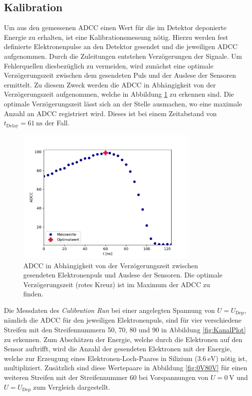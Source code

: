\subsection{Kalibration}
\label{kap:Kalibration}
Um aus den gemessenen ADCC einen Wert für die im Detektor deponierte Energie zu erhalten, ist eine Kalibrationsmessung nötig. Hierzu werden fest definierte Elektronenpulse an den Detektor gesendet und die jeweiligen ADCC aufgenommen.
Durch die Zuleitungen entstehen Verzögerungen der Signale. Um Fehlerquellen diesbezüglich zu vermeiden, wird zunächst eine optimale Verzögerungszeit zwischen dem gesendeten Puls und der Auslese der Sensoren ermittelt. Zu diesem Zweck werden die ADCC in Abhängigkeit von der Verzögerungszeit aufgenommen, welche in Abbildung \ref{fig:Delay} zu erkennen sind. Die optimale Verzögerungszeit lässt sich an der Stelle ausmachen, wo eine maximale Anzahl an ADCC registriert wird. Dieses ist bei einem Zeitabstand von $t_\mathrm{Delay}=\SI{61}{\nano\second}$ der Fall.
\begin{figure}
  \centering
  \includegraphics[width=0.8\textwidth]{plots/Delay.pdf}
  \caption{ADCC in Abhängigkeit von der Verzögerungszeit zwischen gesendeten Elektronenpuls und Auslese der Sensoren. Die optimale Verzögerungszeit (rotes Kreuz) ist im Maximum der ADCC zu finden.}
  \label{fig:Delay}
\end{figure}
\FloatBarrier
Die Messdaten des \textit{Calibration Run} bei einer angelegten Spannung von $U=U_\text{Dep}$, nämlich die ADCC für den jeweiligen Elektronenpuls, sind für vier verschiedene Streifen mit den Streifennummern 50, 70, 80 und 90 in Abbildung \ref{fig:KanalPlot} zu erkennen. Zum Abschätzen der Energie, welche durch die Elektronen auf den Sensor auftrifft, wird die Anzahl der gesendeten Elektronen mit der Energie, welche zur Erzeugung eines Elektronen-Loch-Paares in Silizium ($\SI{3.6}{\electronvolt}$) nötig ist, multipliziert. Zusätzlich sind diese Wertepaare in Abbildung \ref{fig:0V80V} für einen weiteren Streifen mit der Streifennummer 60 bei Vorspannungen von $U=\SI{0}{\volt}$ und $U=U_\mathrm{Dep}$ zum Vergleich dargestellt.
